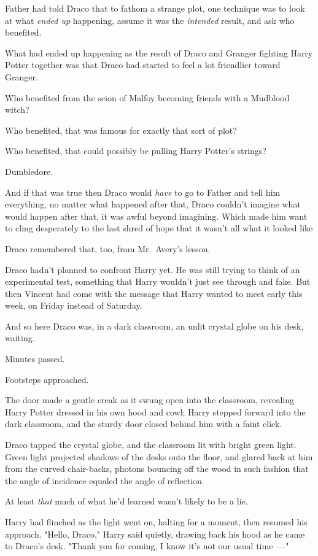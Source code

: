 Father had told Draco that to fathom a strange plot, one technique was to look
at what \emph{ended up} happening, assume it was the \emph{intended} result,
and ask who benefited.

What had ended up happening as the result of Draco and Granger fighting Harry
Potter together{\el} was that Draco had started to feel a lot friendlier
toward Granger.

Who benefited from the scion of Malfoy becoming friends with a Mudblood witch?

Who benefited, that was famous for exactly that sort of plot?

Who benefited, that could possibly be pulling Harry Potter's strings?

Dumbledore.

And if that was true then Draco would \emph{have} to go to Father and tell him
everything, no matter what happened after that, Draco couldn't imagine what
would happen after that, it was awful beyond imagining. Which made him want to
cling desperately to the last shred of hope that it wasn't all what it looked
like{\el}

{\el} Draco remembered that, too, from Mr.~Avery's lesson.

Draco hadn't planned to confront Harry yet. He was still trying to think of an
experimental test, something that Harry wouldn't just see through and fake. But
then Vincent had come with the message that Harry wanted to meet early this
week, on Friday instead of Saturday.

And so here Draco was, in a dark classroom, an unlit crystal globe on his desk,
waiting.

Minutes passed.

Footsteps approached.

The door made a gentle creak as it swung open into the classroom, revealing
Harry Potter dressed in his own hood and cowl; Harry stepped forward into the
dark classroom, and the sturdy door closed behind him with a faint click.

Draco tapped the crystal globe, and the classroom lit with bright green light.
Green light projected shadows of the desks onto the floor, and glared back at
him from the curved chair-backs, photons bouncing off the wood in such fashion
that the angle of incidence equaled the angle of reflection.

At least \emph{that} much of what he'd learned wasn't likely to be a lie.

Harry had flinched as the light went on, halting for a moment, then resumed his
approach. "Hello, Draco," Harry said quietly, drawing back his hood as he came
to Draco's desk. "Thank you for coming, I know it's not our usual time~---"


